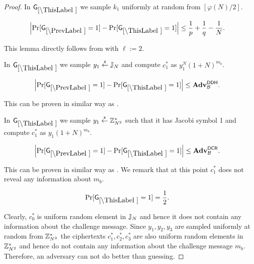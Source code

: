 \begin{proof}
%
%
%

In $\games_\thisgame$ we sample $k_1$ uniformly at random from $[\varphi(N)/2]$. 

\begin{lemma}
\[
\left|\Pr[\games_\prevgame = 1] - \Pr[\games_\thisgame = 1]\right| \leq \frac{1}{p}+\frac{1}{q}-\frac{1}{N}.
\]
\end{lemma}

This lemma directly follows from  with $\ell:=2$.

In $\games_\thisgame$ we sample $y_1 \stackrel{{\scriptscriptstyle\$}}{\leftarrow} \mathbb{J}_N$ and compute $c_1^*$ as  $y_1^{N} (1+N)^{m_b}$. 

\begin{lemma}
\[
\left|\Pr[\games_\prevgame = 1] - \Pr[\games_\thisgame = 1]\right| \leq \advtg_\advB^\ddh.
\]
\end{lemma}
This can be proven in similar way as .

In $\games_\thisgame$ we sample $y_1 \stackrel{{\scriptscriptstyle\$}}{\leftarrow} \mathbb{Z}_{N^2}^*$ such that it has Jacobi symbol 1 and compute $c_1^*$ as $y_1(1+N)^{m_b}$. 

\begin{lemma}
\[
\left|\Pr[\games_\prevgame = 1] - \Pr[\games_\thisgame = 1]\right| \leq \advtg_\advB^\dcr.
\]
\end{lemma}
This can be proven in similar way as . We remark that at this point $c_1^*$ does not reveal any information about $m_b$.

\begin{lemma}\label{nitc-rom-lh:llem}
\[
\Pr[\games_\thisgame = 1] = \half.
\]
\end{lemma}

Clearly, $c_0^*$ is uniform random element in $\mathbb{J}_N$ and hence it does not contain any information about the challenge message. Since $y_1, y_2, y_3$ are sampled uniformly at random from $\mathbb{Z}_{N^2}^*$ the ciphertexts $c_1^*, c_2^*, c_3^*$ are also uniform random elements in $\mathbb{Z}_{N^2}^*$ and hence do not contain any information about the challenge message $m_b$. Therefore, an adversary can not do better than guessing.


\end{proof}

